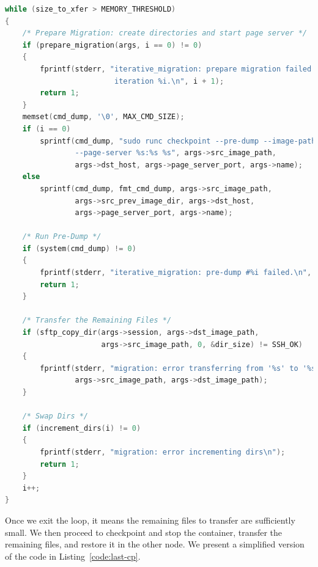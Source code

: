 \begin{lstlisting}[language=C,caption={Iterative migration internal loop.\label{code:iterative-loop}}]
while (size_to_xfer > MEMORY_THRESHOLD)
{
    /* Prepare Migration: create directories and start page server */
    if (prepare_migration(args, i == 0) != 0)
    {
        fprintf(stderr, "iterative_migration: prepare migration failed at \
                         iteration %i.\n", i + 1);
        return 1;
    }
    memset(cmd_dump, '\0', MAX_CMD_SIZE);
    if (i == 0)
        sprintf(cmd_dump, "sudo runc checkpoint --pre-dump --image-path %s \
                --page-server %s:%s %s", args->src_image_path, 
                args->dst_host, args->page_server_port, args->name);
    else
        sprintf(cmd_dump, fmt_cmd_dump, args->src_image_path,
                args->src_prev_image_dir, args->dst_host,
                args->page_server_port, args->name);

    /* Run Pre-Dump */
    if (system(cmd_dump) != 0)
    {
        fprintf(stderr, "iterative_migration: pre-dump #%i failed.\n", i);
        return 1;
    }

    /* Transfer the Remaining Files */
    if (sftp_copy_dir(args->session, args->dst_image_path, 
                      args->src_image_path, 0, &dir_size) != SSH_OK)
    {
        fprintf(stderr, "migration: error transferring from '%s' to '%s'\n",
                args->src_image_path, args->dst_image_path);
    }

    /* Swap Dirs */
    if (increment_dirs(i) != 0)
    {
        fprintf(stderr, "migration: error incrementing dirs\n");
        return 1;
    }
    i++;
}
\end{lstlisting}
Once we exit the loop, it means the remaining files to transfer are sufficiently small.
We then proceed to checkpoint and stop the container, transfer the remaining files, and restore it in the other node.
We present a simplified version of the code in Listing~\ref{code:last-cp}.
